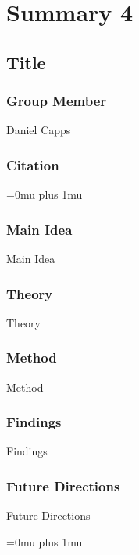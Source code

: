 \section{Summary 4}

\noindent
\subsection{Title}

\subsubsection{Group Member}

\noindent
Daniel Capps

\noindent
\subsubsection{Citation}

\Urlmuskip=0mu plus 1mu\relax

\subsubsection{Main Idea}

\noindent
Main Idea

\subsubsection{Theory}

\noindent
Theory

\subsubsection{Method}

\noindent
Method

\subsubsection{Findings}

\noindent
Findings

\subsubsection{Future Directions}

\noindent
Future Directions 

\Urlmuskip=0mu plus 1mu\relax


